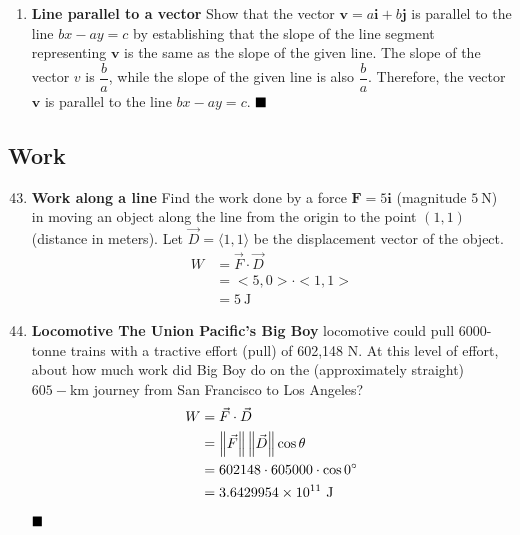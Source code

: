 \begin{enumerate}
    \item \textbf{Line parallel to a vector} Show that the vector $\mathbf{v}=a \mathbf{i}+b \mathbf{j}$ is parallel to the line $b x-a y=c$ by establishing that the slope of the line segment representing $\mathbf{v}$ is the same as the slope of the given line.
          \sol{} The slope of the vector $v$ is $\dfrac{b}{a}$, while the slope of the given line is also $\dfrac{b}{a}$. Therefore, the vector $\mathbf{v}$ is parallel to the line $bx - ay = c$. $\hfill\blacksquare$
\end{enumerate}

\subsection*{Work}

\begin{enumerate}
    \setcounter{enumi}{42}
    \item \textbf{Work along a line} Find the work done by a force $\mathbf{F}=5 \mathbf{i}$
          (magnitude $5 \mathrm{~N}$) in moving an object along the line from the origin
          to the point $(1,1)$ (distance in meters).
          \sol{} Let $\vec{D} = \langle 1, 1 \rangle$ be the displacement vector of the object.
          \begin{align*}
              W & = \vec{F} \cdot \vec{D} \\
                & = <5, 0> \cdot <1, 1>   \\
                & = 5 \mathrm{~J}
          \end{align*}
    \item \textbf{Locomotive The Union Pacific's Big Boy} locomotive could pull 6000-tonne trains
          with a tractive effort (pull) of 602,148 N. At this level of effort, about how
          much work did Big Boy do on the (approximately straight) $605-\mathrm{km}$
          journey from San Francisco to Los Angeles?
          \sol{}
          \begin{align*}
              W & = \vec{F} \cdot \vec{D}                     \\
                & = \left\lVert\vec{F}\right\rVert \left\lVert\vec{D}\right\rVert \cos \theta \\
                & = 602148 \cdot 605000 \cdot \cos 0^{\circ}  \\
                & = 3.6429954 \times 10^{11} \mathrm{~J}
          \end{align*}
          $\hfill\blacksquare$


\end{enumerate}
